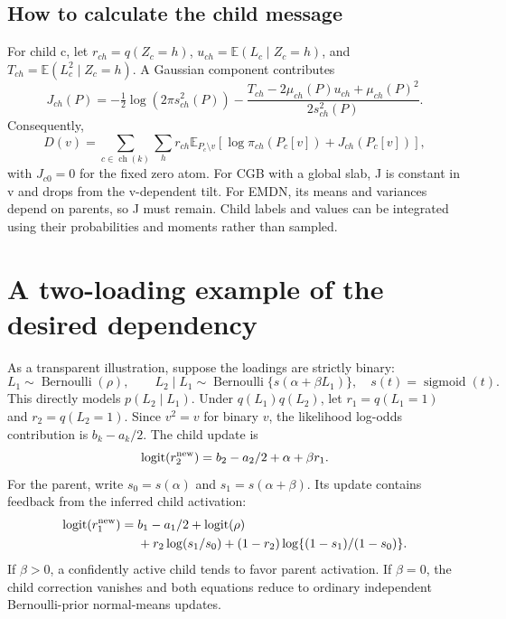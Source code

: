 \documentclass[11pt,a4paper]{article}
\newcommand{\E}{\mathbb E}
\newcommand{\ch}{\operatorname{ch}}
\newcommand{\sigmoid}{\operatorname{sigmoid}}
\newcommand{\logit}{\operatorname{logit}}
\begin{document}
\subsection{How to calculate the child message}
For child c, let \(r_{ch}=q(Z_c=h)\),
\(u_{ch}=\E(L_c\mid Z_c=h)\), and
\(T_{ch}=\E(L_c^2\mid Z_c=h)\). A Gaussian component contributes
\begin{equation}
J_{ch}(P)=-\tfrac12\log(2\pi s_{ch}^2(P))
-\frac{T_{ch}-2\mu_{ch}(P)u_{ch}+\mu_{ch}(P)^2}{2s_{ch}^2(P)}.
\label{eq:childdensity}
\end{equation}
Consequently,
\begin{equation}
D(v)=\sum_{c\in\ch(k)}\sum_h r_{ch}
\E_{P_c\setminus v}\left[\log\pi_{ch}(P_c[v])+J_{ch}(P_c[v])\right],
\label{eq:Dmoments}
\end{equation}
with \(J_{c0}=0\) for the fixed zero atom. For CGB with a global slab, J is
constant in v and drops from the v-dependent tilt. For EMDN, its means
and variances depend on parents, so J must remain. Child labels and values
can be integrated using their probabilities and moments rather than sampled.

\clearpage
\section{A two-loading example of the desired dependency}
As a transparent illustration, suppose the loadings are strictly binary:
\begin{equation}
L_1\sim\operatorname{Bernoulli}(\rho),\qquad
L_2\mid L_1\sim\operatorname{Bernoulli}\{s(\alpha+\beta L_1)\},
\quad s(t)=\sigmoid(t).
\label{eq:binarymodel}
\end{equation}
This directly models \(p(L_2\mid L_1)\). Under
\(q(L_1)q(L_2)\), let \(r_1=q(L_1=1)\) and \(r_2=q(L_2=1)\).
Since \(v^2=v\) for binary \(v\), the likelihood log-odds contribution
is \(b_k-a_k/2\). The child update is
\begin{equation}
\logit(r_2^{\rm new})=b_2-a_2/2+\alpha+\beta r_1.
\label{eq:binarychild}
\end{equation}
For the parent, write \(s_0=s(\alpha)\) and \(s_1=s(\alpha+\beta)\).
Its update contains feedback from the inferred child activation:
\begin{align}
\logit(r_1^{\rm new})
={}&b_1-a_1/2+\logit(\rho)\notag\\
&+r_2\log(s_1/s_0)+(1-r_2)\log\{(1-s_1)/(1-s_0)\}.
\label{eq:binaryparent}
\end{align}
If \(\beta>0\), a confidently active child tends to favor parent
activation. If \(\beta=0\), the child correction vanishes and both equations
reduce to ordinary independent Bernoulli-prior normal-means updates.
\end{document}
